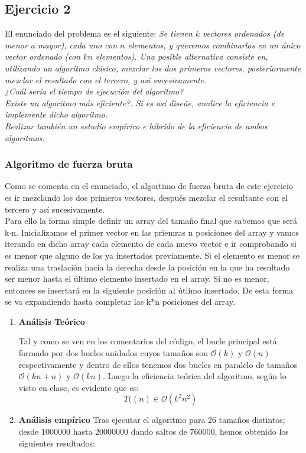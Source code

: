 \documentclass[10pt,a4paper]{article}
\begin{document}
\subsection{Ejercicio 2}
El enunciado del problema es el siguiente: \textit{Se tienen \(k\) vectores ordenados (de menor a mayor), cada uno con \(n\) elementos, y queremos combinarlos
en un único vector ordenado (con \(kn\) elementos). Una posible alternativa consiste en, utilizando un algoritmo clásico, mezclar los dos primeros vectores, posteriormente mezclar el resultado con el tercero, y así sucesivamente.}
\\
\textit{¿Cuál sería el tiempo de ejecución del algoritmo?}
\\
\textit{Existe un algoritmo más eficiente?. Si es así diseñe, analice la eficiencia e implemente dicho algoritmo.}
\\
\textit{Realizar también un estudio empírico e híbrido de la eficiencia de ambos algoritmos.}
\subsubsection{Algoritmo de fuerza bruta}
Como se comenta en el enunciado, el algortimo de fuerza bruta de este ejercicio es ir mezclando los dos primeros vectores, después mezclar el resultante con el tercero y así sucesivamente. \\

Para ello la forma simple definir un array del tamaño final que sabemos que será k$\cdot$n. Inicializamos el primer vector en las priemras n posiciones del array y vamos iterando en dicho array cada elemento de cada nuevo vector e ir comprobando si es menor que alguno de los ya insertados previamente. Si el elemento es menor se realiza una traslación hacia la derecha desde la posición en la que ha resultado ser menor hasta el último elemento insertado en el array. Si no es menor, entonces se insertará en la siguiente posición al útlimo insertado. De esta forma se va expandiendo hasta completar las k*n posiciones del array.
\\

\begin{enumerate}
	\item \textbf{Análisis Teórico}
	
	
	
Tal y como se ven en los comentarios del código, el bucle principal está formado por dos bucles anidados cuyos tamaños son \(\mathcal{O}(k)\) y \(\mathcal{O}(n)\) respectivamente y dentro de ellos tenemos dos bucles en paralelo de tamaños \(\mathcal{O}(kn + n)\) y \(\mathcal{O}(kn)\). Luego la eficiencia teórica del algoritmo, según lo visto en clase, es evidente que es:
\[
 	T((n) \in \mathcal{O}(k^2n^2)
 \]
 
 \item \textbf{Análisis empírico}
Tras ejecutar el algoritmo para 26 tamaños distintos; desde 1000000 hasta 20000000 dando saltos de 760000, hemos obtenido los siguientes resultados:


 \end{enumerate}
\end{document}
